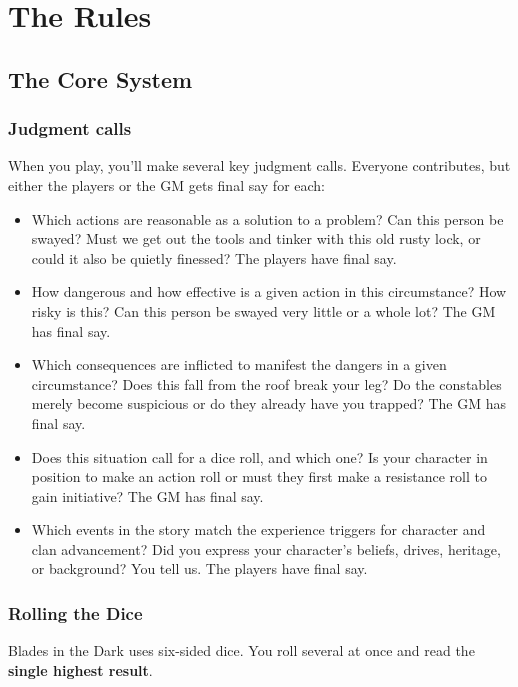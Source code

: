\chapter{The Rules}

\section{The Core System}

\subsection{Judgment calls}

When you play, you’ll make several key judgment calls. Everyone contributes, but either the players or the GM gets final say for each:

\begin{itemize}
\item Which actions are reasonable as a solution to a problem? Can this person be swayed? Must we get out the tools and tinker with this old rusty lock, or could it also be quietly finessed? The players have final say.
\item How dangerous and how effective is a given action in this circumstance? How risky is this? Can this person be swayed very little or a whole lot? The GM has final say.
\item Which consequences are inflicted to manifest the dangers in a given circumstance? Does this fall from the roof break your leg? Do the constables merely become suspicious or do they already have you trapped? The GM has final say.
\item Does this situation call for a dice roll, and which one? Is your character in position to make an action roll or must they first make a resistance roll to gain initiative? The GM has final say.
\item Which events in the story match the experience triggers for character and clan advancement? Did you express your character’s beliefs, drives, heritage, or background? You tell us. The players have final say.
\end{itemize}

\subsection{Rolling the Dice}

Blades in the Dark uses six-sided dice. You roll several at once and read the \textbf{single highest result}.

